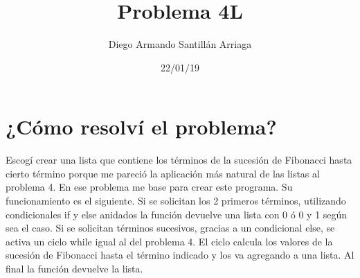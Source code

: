 \documentclass[letterpaper, 12pt, oneside]{article}%
\title{\Huge Problema 4L}
\author{Diego Armando Santillán Arriaga}
\date{22/01/19}
\begin{document}
\maketitle
\newpage
\section*{¿Cómo resolví el problema?}
Escogí crear una lista que contiene los términos de la sucesión de Fibonacci hasta cierto término porque me pareció la aplicación más natural de las listas al problema 4. En ese problema me base para crear este programa. Su funcionamiento es el siguiente. Si se solicitan los 2 primeros términos, utilizando condicionales if y else anidados la función devuelve una lista con 0 ó 0 y 1 según sea el caso. Si se solicitan términos sucesivos, gracias a un condicional else, se activa un ciclo while igual al del problema 4. El ciclo calcula los valores de la sucesión de Fibonacci hasta el término indicado y los va agregando a una lista. Al final la función devuelve la lista.  
\end{document}
